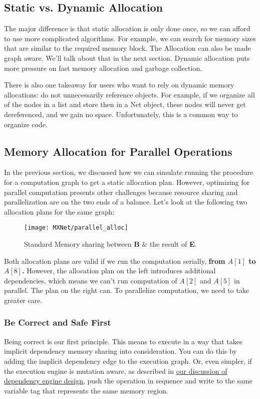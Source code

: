 \subsection{Static vs. Dynamic Allocation}
The major difference is that static allocation is only done once, so we can afford to use more complicated algorithms. For example, we can search for memory sizes that are similar to the required memory block. The Allocation can also be made graph aware. We’ll talk about that in the next section. Dynamic allocation puts more pressure on fast memory allocation and garbage collection.

There is also one takeaway for users who want to rely on dynamic memory allocations: do not unnecessarily reference objects. For example, if we organize all of the nodes in a list and store then in a Net object, these nodes will never get dereferenced, and we gain no space. Unfortunately, this is a common way to organize code.

\subsection{Memory Allocation for Parallel Operations}
In the previous section, we discussed how we can simulate running the procedure for a computation graph to get a static allocation plan. However, optimizing for parallel computation presents other challenges because resource sharing and parallelization are on the two ends of a balance. Let’s look at the following two allocation plans for the same graph:
\begin{figure}[!hbtp]
\centering
\texttt{[image: MXNet/parallel\_alloc]}
\caption{Standard Memory sharing between \textbf{B} \& the result of \textbf{E}.}
\end{figure}

Both allocation plans are valid if we run the computation serially, {\bfseries from $A[1]$ to $A[8]$. } However, the allocation plan on the left introduces additional dependencies, which means we can't run computation of $A[2]$ and $A[5]$ in parallel. The plan on the right can. To parallelize computation, we need to take greater care. 

\subsubsection{Be Correct and Safe First}
Being correct is our first principle. This means to execute in a way that takes implicit dependency memory sharing into consideration. You can do this by adding the implicit dependency edge to the execution graph. Or, even simpler, if the execution engine is mutation aware, as described in \href{https://mxnet.incubator.apache.org/architecture/note_engine.html}{our discussion of dependency engine design}, push the operation in sequence and write to the same variable tag that represents the same memory region.

